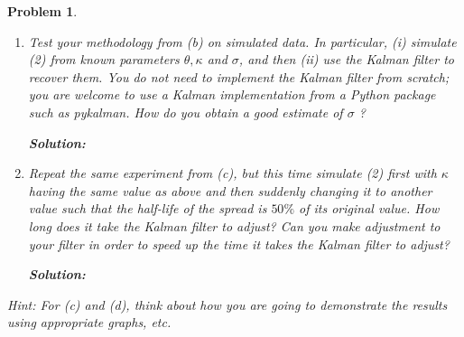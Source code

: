 \documentclass[11pt]{article}
\theoremstyle{plain} %
\newtheorem{problem}[theorem]{Problem}
\newenvironment{solution}
{\color{C2}\normalfont\begin{framed}\begingroup\textbf{Solution:} }
  {\endgroup\end{framed}}
\theoremstyle{remark}
\begin{document}
\begin{problem}
\begin{enumerate}[label=(\alph*)]
\begin{solution}
          Naturally, we set the initial state variable $\mathbf{x}_0  \sim \mathcal{N}\left(\boldsymbol{\mu}_{0}, \mathbf{P}_{0}\right)$
          where $\boldsymbol{\mu}_{0} = \begin{bmatrix}
              1 \\
              s_0
            \end{bmatrix}$ and $\mathbf{P}_{0} = \boldsymbol{0}$.

          Therefore, by our construction, we have the linear state space model:
          \begin{align*}
            \begin{aligned}
               & \mathbf{x}_{t}=\mathbf{F}_{t} \mathbf{x}_{t-1}+\mathbf{w}_{t} \\
               & \mathbf{y}_{t}=\mathbf{H}_{t} \mathbf{x}_{t}+\mathbf{v}_{t}
            \end{aligned}\quad \text{ where } \quad
            \mathbf{x}_{0} \sim \mathcal{N}\left(\boldsymbol{\mu}_{0}, \mathbf{P}_{0}\right),\quad
            \mathbf{w}_{t} \sim \mathcal{N}\left(\mathbf{0}, \mathbf{Q}_{t}\right), \quad
            \mathbf{v}_{t} \sim \mathcal{N}\left(\mathbf{0}, \mathbf{R}_{t}\right)
          \end{align*}
          Additionally, the initial state $\mathbf{x}_{0}$ and the noise terms $\mathbf{w}_{t},
            \mathbf{v}_{t}$ are all assumed to be mutually independent.
        \end{solution}
  \item Test your methodology from (b) on simulated data. In particular, (i)
        simulate (2) from known parameters $\theta, \kappa$ and $\sigma$, and then
        (ii) use the Kalman filter to recover them. You do not need to implement the
        Kalman filter from scratch; you are welcome to use a Kalman implementation
        from a Python package such as pykalman. How do you obtain a good estimate of
        $\sigma$ ?

        \begin{solution}

        \end{solution}
  \item Repeat the same experiment from (c), but this time simulate (2) first
        with $\kappa$ having the same value as above and then suddenly changing it to
        another value such that the half-life of the spread is $50 \%$ of its original
        value. How long does it take the Kalman filter to adjust? Can you make
        adjustment to your filter in order to speed up the time it takes the Kalman
        filter to adjust?

        \begin{solution}

        \end{solution}
\end{enumerate}
Hint: For (c) and (d), think about how you are going to demonstrate the results
using appropriate graphs, etc.
\end{problem}
\end{document}
